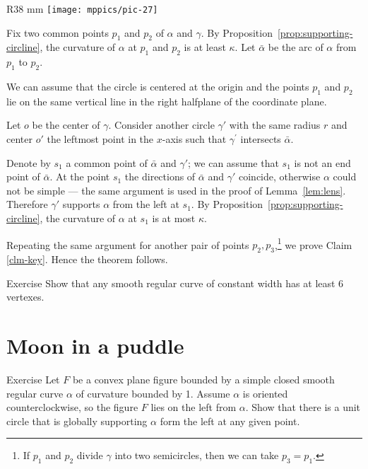 \begin{wrapfigure}{R}{38 mm}
\vskip-0mm
\centering
\texttt{[image: mppics/pic-27]}
\vskip0mm
\end{wrapfigure}
  
Fix two common points $p_1$ and $p_2$ of $\alpha$ and $\gamma$.
By Proposition~\ref{prop:supporting-circline}, the curvature of $\alpha$ at $p_1$ and $p_2$ is at least $\kappa$.
Let $\bar\alpha$ be the arc of $\alpha$ from $p_1$ to $p_2$.

We can assume that the circle is centered at the origin 
and the points $p_1$ and $p_2$ lie on the same vertical line in the right halfplane of the coordinate plane.

Let $o$ be the center of $\gamma$.
Consider another circle $\gamma'$ with the same radius $r$ and center $o'$ the leftmost point in the $x$-axis such that $\gamma^{\prime}$ intersects $\bar\alpha$.

Denote by $s_1$ a common point of $\bar\alpha$ and $\gamma'$;
we can assume that $s_1$ is not an end point of $\bar\alpha$.
At the point $s_1$ the directions of $\bar\alpha$ and $\gamma'$ coincide,
otherwise $\alpha$ could not be simple --- the same argument is used in the proof of Lemma~\ref{lem:lens}.
Therefore $\gamma'$ supports $\alpha$ from the left at $s_1$.
By Proposition~\ref{prop:supporting-circline}, the curvature of $\alpha$ at $s_1$ is at most $\kappa$.

Repeating the same argument for another pair of points $p_2,p_3$,\footnote{If $p_1$ and $p_2$ divide $\gamma$ into two semicircles, then we can take $p_3=p_1$.} 
we prove Claim \ref{clm-key}.
Hence the theorem follows.
\qeds

\begin{thm}{Exercise}
Show that any smooth regular curve of constant width has at least 6 vertexes.
\end{thm}

\section{Moon in a puddle}

\begin{thm}{Exercise}\label{ex:moon}
Let $F$ be a convex plane figure bounded by a simple closed smooth regular curve $\alpha$ of curvature bounded by 1.
Assume $\alpha$ is oriented counterclockwise, so the figure $F$ lies on the left from $\alpha$.
Show that there is a unit circle that is globally supporting $\alpha$ form the left at any given point.
\end{thm}


